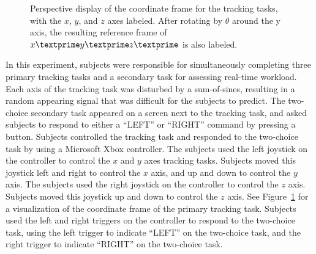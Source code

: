 \begin{figure}[tb]
\begin{center}

        \caption[Perspective display of the coordinate frame for the tracking tasks]{Perspective display of the coordinate frame for the tracking tasks, with the $x$, $y$, and $z$ axes labeled. After rotating by $\theta$ around the y axis, the resulting reference frame of $x\textprime y\textprime z\textprime$ is also labeled.}
        \label{designdiagram}
    \end{center}
\end{figure}

In this experiment, subjects were responsible for simultaneously completing three primary tracking tasks and a secondary task for assessing real-time workload.
Each axis of the tracking task was disturbed by a sum-of-sines, resulting in a random appearing signal that was difficult for the subjects to predict.
The two-choice secondary task appeared on a screen next to the tracking task, and asked subjects to respond to either a ``LEFT'' or ``RIGHT'' command by pressing a button.
Subjects controlled the tracking task and responded to the two-choice task by using a Microsoft Xbox controller.
The subjects used the left joystick on the controller to control the $x$ and $y$ axes tracking tasks.
Subjects moved this joystick left and right to control the $x$ axis, and up and down to control the $y$ axis.
The subjects used the right joystick on the controller to control the $z$ axis.
Subjects moved this joystick up and down to control the $z$ axis.
See Figure~\ref{designdiagram} for a visualization of the coordinate frame of the primary tracking task.
Subjects used the left and right triggers on the controller to respond to the two-choice task, using the left trigger to indicate ``LEFT'' on the two-choice task, and the right trigger to indicate ``RIGHT'' on the two-choice task.


